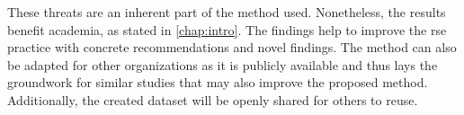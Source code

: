 These threats are an inherent part of the method used. Nonetheless, the results benefit academia, as stated in \autoref{chap:intro}. The findings help to improve the \acrshort{rse} practice with concrete recommendations and novel findings. The method can also be adapted for other organizations as it is publicly available \cite{Quach_Mapping-Research-Software-Landscapes-through-Exploratory-Studies-of-GitHub-Data_2022} and thus lays the groundwork for similar studies that may also improve the proposed method. Additionally, the created dataset will be openly shared for others to reuse.





